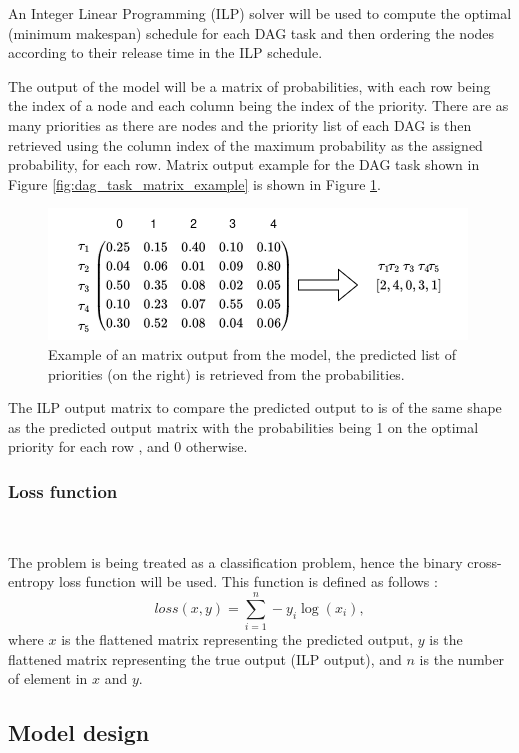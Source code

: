 An Integer Linear Programming (ILP) solver will be used to compute
the optimal (minimum makespan) schedule for each DAG task and then
ordering the nodes according to their release time in the ILP schedule.

The output of the model will be a matrix of probabilities,
with each row being the index of a node and each column being the index of the priority.
There are as many priorities as there are nodes and 
the priority list of each DAG is then retrieved using the column
index of the maximum probability as the assigned probability, for each row.
Matrix output example for the DAG task shown in Figure \ref{fig:dag_task_matrix_example}
is shown in Figure \ref{fig:dag_output_matrix_example}.

\begin{figure}
    \centering
    \includegraphics[width=\linewidth]{images/output_matrix_example.drawio.png}
    \caption{Example of an matrix output from the model, the predicted list of priorities (on the right)
    is retrieved from the probabilities.}
    \label{fig:dag_output_matrix_example}
\end{figure}

The ILP output matrix to compare the predicted output to is of the same shape
as the predicted output matrix with the probabilities being 1 on the optimal priority for each row 
, and 0 otherwise.

\subsubsection{Loss function}
~

The problem is being treated as a classification problem,
hence the binary cross-entropy loss function will be used.
This function is defined as follows :
\[
    loss(x, y) = \sum_{i=1}^{n} -y_i\log(x_i),
\]
where $x$ is the flattened matrix representing the predicted output,
$y$ is the flattened matrix representing the true output (ILP output),
and $n$ is the number of element in $x$ and $y$.


\subsection{Model design}
~

